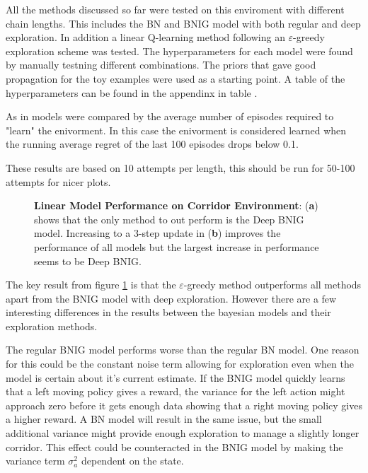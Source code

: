 All the methods discussed so far were tested on this enviroment with different chain lengths. This includes the BN and BNIG model with both regular and deep exploration. In addition a linear Q-learning method following an $\varepsilon$-greedy exploration scheme was tested. The hyperparameters for each model were found by manually testning different combinations. The priors that gave good propagation for the toy examples were used as a starting point. A table of the hyperparameters can be found in the appendinx in table \todo.

As in \cite{osband_2018} models were compared by the average number of episodes required to "learn" the enivorment. In this case the enivorment is considered learned when the running average regret of the last 100 episodes drops below 0.1.

\todo These results are based on 10 attempts per length, this should be run for 50-100 attempts for nicer plots.

\begin{figure}[H]
    \centering
    \caption{\textbf{Linear Model Performance on Corridor Environment}: (\textbf{a}) shows that the only method to out perform is the Deep BNIG model. Increasing to a 3-step update in (\textbf{b}) improves the performance of all models but the largest increase in performance seems to be Deep BNIG.}
    \label{fig:linear_corridor}
\end{figure}

The key result from figure \ref{fig:linear_corridor} is that the $\varepsilon$-greedy method outperforms all methods apart from the BNIG model with deep exploration. However there are a few interesting differences in the results between the bayesian models and their exploration methods. 

The regular BNIG model performs worse than the regular BN model. One reason for this could be the constant noise term allowing for exploration even when the model is certain about it's current estimate. If the BNIG model quickly learns that a left moving policy gives a reward, the variance for the left action might approach zero before it gets enough data showing that a right moving policy gives a higher reward. A BN model will result in the same issue, but the small additional variance might provide enough exploration to manage a slightly longer corridor. This effect could be counteracted in the BNIG model by making the variance term $\sigma_a^2$ dependent on the state.

